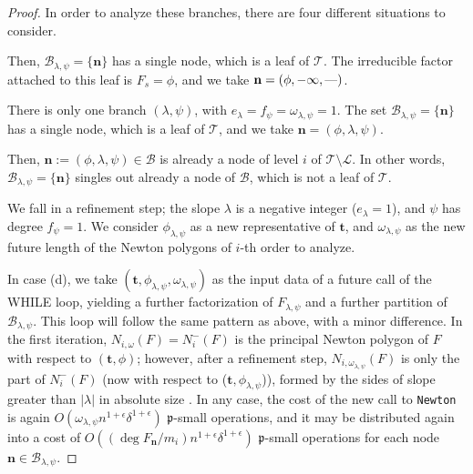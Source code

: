 \documentclass{amsart}
\begin{document}
\begin{proof}
In order to analyze these branches, there are four different situations to consider.\medskip

Then, ${{\mathcal B}}_{\lambda,\psi}=\{{\mathbf{n}}\}$ has a single node, which is a leaf of ${\mathcal{T}}$. The irreducible factor attached to this leaf is $F_s=\phi$, and we take ${\mathbf{n}}=(\phi,-\infty,\hbox{---})$.\medskip

     
There is only one branch $(\lambda,\psi)$, with $e_\lambda=f_\psi=\omega_{\lambda,\psi}=1$. The set ${{\mathcal B}}_{\lambda,\psi}=\{{\mathbf{n}}\}$ has a single node, which is a leaf of ${\mathcal{T}}$, and we take ${\mathbf{n}}=(\phi,\lambda,\psi)$.
\medskip
     
Then, ${\mathbf{n}}:=(\phi,\lambda,\psi)\in{{\mathcal B}}$ is already a node of level $i$ of ${\mathcal{T}}\setminus{\mathcal{L}}$. In other words, ${{\mathcal B}}_{\lambda,\psi}=\{{\mathbf{n}}\}$ singles out already a node of ${{\mathcal B}}$, which is not a leaf of ${\mathcal{T}}$.\medskip

We fall in a refinement step; the slope $\lambda$ is a negative integer ($e_\lambda=1$), and $\psi$ has degree $f_\psi=1$. We consider $\phi_{\lambda,\psi}$ as a new representative of ${\mathbf{t}}$, and $\omega_{\lambda,\psi}$ as the new future length of the Newton polygons of $i$-th order to analyze.\medskip 

In case (d), we take $({\mathbf{t}},\phi_{\lambda,\psi},\omega_{\lambda,\psi})$ as the input data of a future call of the WHILE loop, yielding a further factorization of $F_{\lambda,\psi}$ and a further partition of ${{\mathcal B}}_{\lambda,\psi}$. This loop will follow the same pattern as above, with a minor difference. In the first iteration, $N_{i,\omega}(F)=N_i^-(F)$ is the principal Newton polygon of $F$ with respect to $({\mathbf{t}},\phi)$; however, after a refinement step, $N_{i,\omega_{\lambda,\psi}}(F)$ is only the part of $N_i^-(F)$ (now with respect to (${\mathbf{t}},\phi_{\lambda,\psi}$)), formed by the sides of slope greater than $|\lambda|$ in absolute size \cite[Sec. 3]{algorithm}. In any case, the cost of the new call to {\tt Newton} is again $O(\omega_{\lambda,\psi} n^{1+\epsilon}\delta^{1+\epsilon})$ ${\mathfrak{p}}$-small operations, and it may be distributed again into a cost of $O((\deg F_{\mathbf{n}}/m_i) n^{1+\epsilon}\delta^{1+\epsilon})$ ${\mathfrak{p}}$-small operations for each node ${\mathbf{n}}\in{{\mathcal B}}_{\lambda,\psi}$.    


\end{proof}
\end{document}
